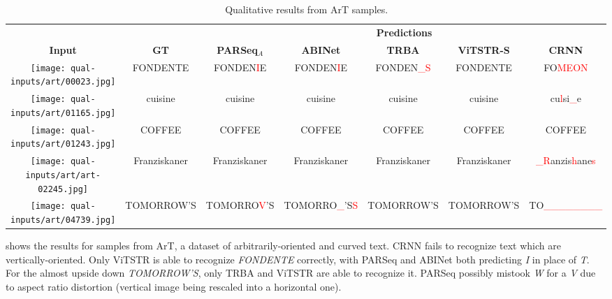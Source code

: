 \begin{table*}[htbp]
  \centering
  \footnotesize
  \setlength\tabcolsep{2pt}
  \caption{Qualitative results from ArT samples.}
  \begin{tabular}{ c c c c c c c }
    \toprule
    & & \multicolumn{5}{c}{\textbf{Predictions}} \\
    \cmidrule{3-7}
    \textbf{Input} & \textbf{GT} & \textbf{PARSeq$_A$} & \textbf{ABINet} & \textbf{TRBA} & \textbf{ViTSTR-S} & \textbf{CRNN} \\
    \midrule
    \texttt{[image: qual-inputs/art/00023.jpg]} & {\scriptsize FONDENTE} & {\scriptsize FONDEN\textcolor{red}{I}E} & {\scriptsize FONDEN\textcolor{red}{I}E} & {\scriptsize FONDEN\textcolor{red}{\_S}} & {\scriptsize FONDENTE} & {\scriptsize FO\textcolor{red}{MEON}} \\
    \texttt{[image: qual-inputs/art/01165.jpg]} & cuisine & cuisine & cuisine & cuisine & cuisine & cu\textcolor{red}{l}si\textcolor{red}{\_}e \\
    \texttt{[image: qual-inputs/art/01243.jpg]} & COFFEE & COFFEE & COFFEE & COFFEE & COFFEE & COFFEE \\
    \texttt{[image: qual-inputs/art/art-02245.jpg]} & {\scriptsize Franziskaner} & {\scriptsize Franziskaner} & {\scriptsize Franziskaner} & {\scriptsize Franziskaner} & {\scriptsize Franziskaner} & {\scriptsize\textcolor{red}{\_R}anzis\textcolor{red}{h}ane\textcolor{red}{s}} \\
    \texttt{[image: qual-inputs/art/04739.jpg]} & {\tiny TOMORROW'S} & {\tiny TOMORRO\textcolor{red}{V}'S} & {\tiny TOMORRO\textcolor{red}{\_}'S\textcolor{red}{S}} & {\tiny TOMORROW'S} & {\tiny TOMORROW'S} & {\tiny TO\textcolor{red}{\_\_\_\_\_\_\_\_}} \\
    \bottomrule
  \end{tabular}
  \label{tab:qual-results-art}
\end{table*}



 shows the results for samples from ArT, a dataset of arbitrarily-oriented and curved text. CRNN fails to recognize text which are vertically-oriented. Only ViTSTR is able to recognize \textit{FONDENTE} correctly, with PARSeq and ABINet both predicting \textit{I} in place of \textit{T}. For the almost upside down \textit{TOMORROW'S}, only TRBA and ViTSTR are able to recognize it. PARSeq possibly mistook \textit{W} for a \textit{V} due to aspect ratio distortion (vertical image being rescaled into a horizontal one).


